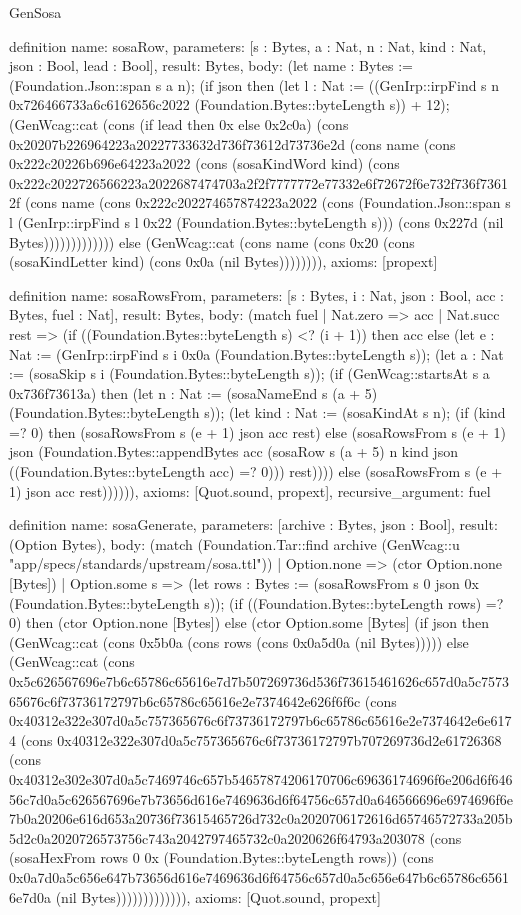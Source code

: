 \begin{lexlean}{GenSosa}
\begin{semanticmodule}
definition{
  name: sosaRow,
  parameters: [s : Bytes, a : Nat, n : Nat, kind : Nat, json : Bool, lead : Bool],
  result: Bytes,
  body: (let name : Bytes := (Foundation.Json::span s a n); (if json then (let l : Nat := ((GenIrp::irpFind s n 0x726466733a6c6162656c2022 (Foundation.Bytes::byteLength s)) + 12); (GenWcag::cat (cons (if lead then 0x else 0x2c0a) (cons 0x20207b226964223a20227733632d736f73612d73736e2d (cons name (cons 0x222c20226b696e64223a2022 (cons (sosaKindWord kind) (cons 0x222c2022726566223a2022687474703a2f2f7777772e77332e6f72672f6e732f736f73612f (cons name (cons 0x222c202274657874223a2022 (cons (Foundation.Json::span s l (GenIrp::irpFind s l 0x22 (Foundation.Bytes::byteLength s))) (cons 0x227d (nil Bytes))))))))))))) else (GenWcag::cat (cons name (cons 0x20 (cons (sosaKindLetter kind) (cons 0x0a (nil Bytes)))))))),
  axioms: [propext]
}

definition{
  name: sosaRowsFrom,
  parameters: [s : Bytes, i : Nat, json : Bool, acc : Bytes, fuel : Nat],
  result: Bytes,
  body: (match fuel
    | Nat.zero => acc
    | Nat.succ rest => (if ((Foundation.Bytes::byteLength s) <? (i + 1)) then acc else (let e : Nat := (GenIrp::irpFind s i 0x0a (Foundation.Bytes::byteLength s)); (let a : Nat := (sosaSkip s i (Foundation.Bytes::byteLength s)); (if (GenWcag::startsAt s a 0x736f73613a) then (let n : Nat := (sosaNameEnd s (a + 5) (Foundation.Bytes::byteLength s)); (let kind : Nat := (sosaKindAt s n); (if (kind =? 0) then (sosaRowsFrom s (e + 1) json acc rest) else (sosaRowsFrom s (e + 1) json (Foundation.Bytes::appendBytes acc (sosaRow s (a + 5) n kind json ((Foundation.Bytes::byteLength acc) =? 0))) rest)))) else (sosaRowsFrom s (e + 1) json acc rest)))))),
  axioms: [Quot.sound, propext],
  recursive_argument: fuel
}

definition{
  name: sosaGenerate,
  parameters: [archive : Bytes, json : Bool],
  result: (Option Bytes),
  body: (match (Foundation.Tar::find archive (GenWcag::u "app/specs/standards/upstream/sosa.ttl"))
    | Option.none => (ctor Option.none [Bytes])
    | Option.some s => (let rows : Bytes := (sosaRowsFrom s 0 json 0x (Foundation.Bytes::byteLength s)); (if ((Foundation.Bytes::byteLength rows) =? 0) then (ctor Option.none [Bytes]) else (ctor Option.some [Bytes] (if json then (GenWcag::cat (cons 0x5b0a (cons rows (cons 0x0a5d0a (nil Bytes))))) else (GenWcag::cat (cons 0x5c626567696e7b6c65786c65616e7d7b507269736d536f73615461626c657d0a5c757365676c6f73736172797b6c65786c65616e2e7374642e626f6f6c (cons 0x40312e322e307d0a5c757365676c6f73736172797b6c65786c65616e2e7374642e6e6174 (cons 0x40312e322e307d0a5c757365676c6f73736172797b707269736d2e61726368 (cons 0x40312e302e307d0a5c7469746c657b54657874206170706c69636174696f6e206d6f64656c7d0a5c626567696e7b73656d616e7469636d6f64756c657d0a646566696e6974696f6e7b0a20206e616d653a20736f73615465726d732c0a2020706172616d65746572733a205b5d2c0a2020726573756c743a2042797465732c0a2020626f64793a203078 (cons (sosaHexFrom rows 0 0x (Foundation.Bytes::byteLength rows)) (cons 0x0a7d0a5c656e647b73656d616e7469636d6f64756c657d0a5c656e647b6c65786c65616e7d0a (nil Bytes))))))))))))),
  axioms: [Quot.sound, propext]
}
\end{semanticmodule}
\end{lexlean}
